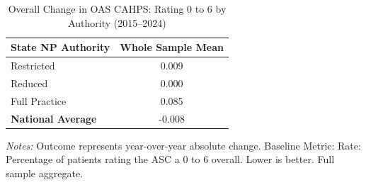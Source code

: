 \begin{table}[htbp]
    \centering
    \caption{Overall Change in OAS CAHPS: Rating 0 to 6 by Authority (2015--2024)}
    \label{tab:d_oas_rating_0_6_full}
    \vspace{0.2cm}
    \begin{tabular}{lc}
        \toprule
        \textbf{State NP Authority} & \textbf{Whole Sample Mean} \\
        \midrule
        Restricted & 0.009 \\
        Reduced & 0.000 \\
        Full Practice & 0.085 \\
        \midrule
        \textbf{National Average} & -0.008 \\
        \bottomrule
    \end{tabular}
    \vspace{0.1cm}
    \begin{minipage}{0.6\textwidth}
        \footnotesize \textit{Notes:} Outcome represents year-over-year absolute change. Baseline Metric: Rate: Percentage of patients rating the ASC a 0 to 6 overall. Lower is better. Full sample aggregate.
    \end{minipage}
\end{table}